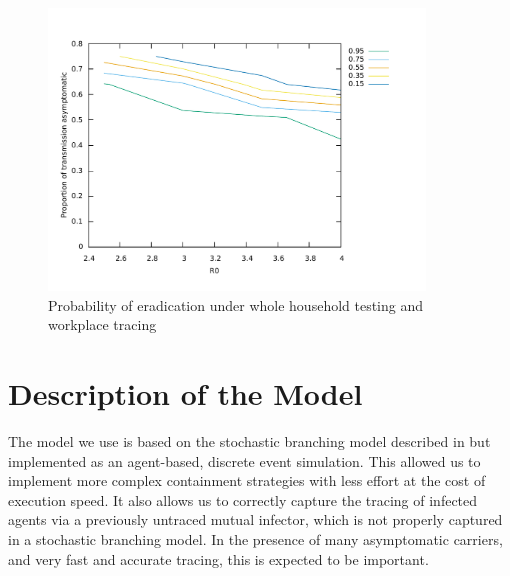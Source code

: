 \documentclass{article}
\begin{document}
\begin{figure}
\begin{center}
\includegraphics[width = 10cm]{workplaceAndHouseholdEnforcement.pdf}
\end{center}
\caption{Probability of eradication under whole household testing and workplace tracing}
\label{householdAndWorkplaceEnforcement}
\end{figure}

\section{Description of the Model}

The model we use is based on the stochastic branching model described in \cite{hellewellfeasibility} but implemented as an agent-based, discrete event simulation. This allowed us to implement more complex containment strategies with less effort at the cost of execution speed. It also allows us to correctly capture the tracing of infected agents via a previously untraced mutual infector, which is not properly captured in a stochastic branching model. In the presence of many asymptomatic carriers, and very fast and accurate tracing, this is expected to be important.
\end{document}
